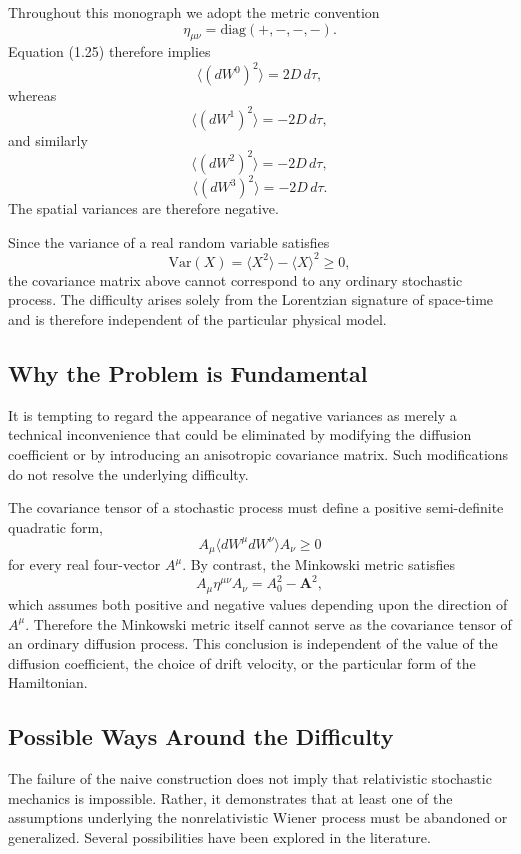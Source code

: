 Throughout this monograph we adopt the metric convention
\[\eta_{\mu\nu}=\mathrm{diag}(+,-,-,-).\]
Equation (1.25) therefore implies
\[\langle(dW^0)^2\rangle=2D\,d\tau ,\]
whereas
\[\langle(dW^1)^2\rangle=-2D\,d\tau ,\]
and similarly
\[\langle(dW^2)^2\rangle=-2D\,d\tau ,\]
\[\langle(dW^3)^2\rangle=-2D\,d\tau .\]
The spatial variances are therefore negative.

Since the variance of a real random variable satisfies
\[\mathrm{Var}(X)=\langle X^2\rangle-\langle X\rangle^2\ge 0 ,\]
the covariance matrix above cannot correspond to any ordinary stochastic
process.
The difficulty arises solely from the Lorentzian signature of space-time
and is therefore independent of the particular physical model.

\subsection{Why the Problem is Fundamental}

It is tempting to regard the appearance of negative variances as merely
a technical inconvenience that could be eliminated by modifying the
diffusion coefficient or by introducing an anisotropic covariance
matrix.
Such modifications do not resolve the underlying difficulty.

The covariance tensor of a stochastic process must define a positive
semi-definite quadratic form,
\[A_\mu\langle dW^\mu dW^\nu\rangle A_\nu\ge 0\]
for every real four-vector \(A^\mu\).
By contrast, the Minkowski metric satisfies
\[A_\mu\eta^{\mu\nu}A_\nu=A_0^2-\mathbf{A}^2 ,\]
which assumes both positive and negative values depending upon the
direction of \(A^\mu\).
Therefore the Minkowski metric itself cannot serve as the covariance
tensor of an ordinary diffusion process.
This conclusion is independent of the value of the diffusion
coefficient, the choice of drift velocity, or the particular form of the
Hamiltonian.

\subsection{Possible Ways Around the Difficulty}

The failure of the naive construction does not imply that relativistic
stochastic mechanics is impossible.
Rather, it demonstrates that at least one of the assumptions underlying
the nonrelativistic Wiener process must be abandoned or generalized.
Several possibilities have been explored in the literature.

